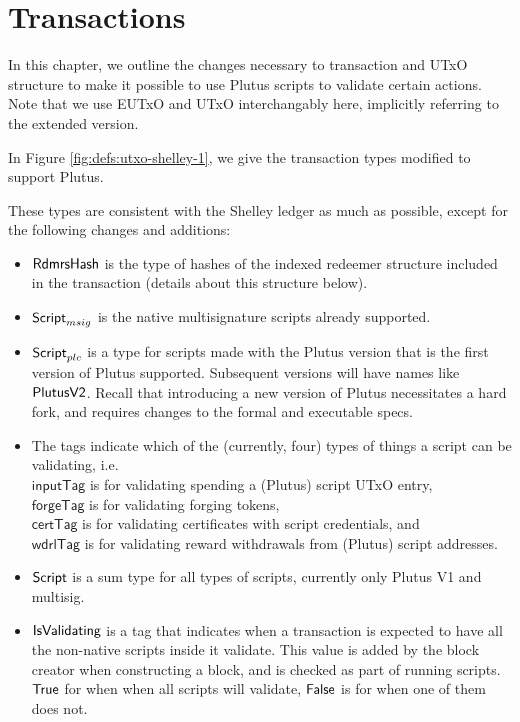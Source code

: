 \section{Transactions}
\label{sec:transactions}

In this chapter, we outline the changes necessary to transaction and
UTxO structure to make it possible to use Plutus scripts to validate
certain actions. Note that we use EUTxO and UTxO interchangably here,
implicitly referring to the extended version.

In Figure \ref{fig:defs:utxo-shelley-1}, we give the transaction types modified
to support Plutus.

These types are consistent with the Shelley ledger
as much as possible,
except for the following changes and additions:

\begin{itemize}
  \item $\mathsf{RdmrsHash}$ is the type of hashes of the indexed redeemer structure
  included in the transaction (details about this structure below).

  \item $\mathsf{Script}_{msig}$ is the native multisignature scripts already supported.

  \item $\mathsf{Script}_{plc}$ is a type for scripts made with the Plutus version
  that is the first version of Plutus supported. Subsequent versions will
  have names like $\mathsf{PlutusV2}$. Recall that introducing
  a new version of Plutus necessitates a hard fork, and requires changes
  to the formal and executable specs.

  \item The tags indicate which of the (currently, four) types of things a script
  can be validating, i.e. \\
  $\mathsf{inputTag}$ is for validating spending a (Plutus) script UTxO entry, \\
  $\mathsf{forgeTag}$ is for validating forging tokens, \\
  $\mathsf{certTag}$  is for validating certificates with script credentials, and  \\
  $\mathsf{wdrlTag}$ is for validating reward withdrawals from (Plutus) script addresses.

  \item $\mathsf{Script}$ is a sum type for all types of scripts, currently only
  Plutus V1 and multisig.
  \item $\mathsf{IsValidating}$ is a tag that indicates when a transaction is
  expected to have all the non-native scripts inside it validate.
  This value is added by the block creator when
  constructing a block, and is checked as part of running scripts.
  $\mathsf{True}$ for when when all scripts will validate,
  $\mathsf{False}$ is for when one of them does not.


\end{itemize}
